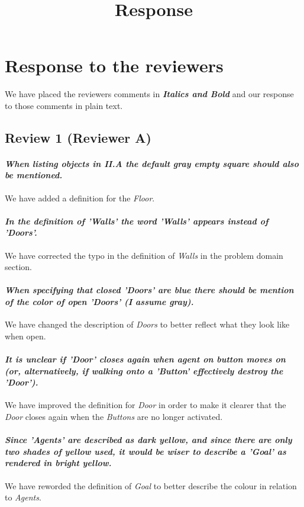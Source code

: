 \documentclass{article}
\title{Response}
\begin{document}
\maketitle
\section{Response to the reviewers}
We have placed the reviewers comments in \textit{\textbf{Italics and Bold}} and our response to those comments in plain text.

\subsection{Review 1 (Reviewer A)}
\paragraph*{\textit{When listing objects in  II.A the default gray empty square should also be mentioned.}}
We have added a definition for the \emph{Floor}.
\paragraph*{\textit{In the definition of 'Walls' the word 'Walls' appears instead of 'Doors'.}}
We have corrected the typo in the definition of \emph{Walls} in the problem domain section.
\paragraph*{\textit{When specifying that closed 'Doors' are blue there should be mention of the color of open 'Doors' (I assume gray).}}
We have changed the description of \emph{Doors} to better reflect what they look like when open.
\paragraph*{\textit{It is unclear if 'Door' closes again when agent on button moves on (or, alternatively, if walking onto a 'Button' effectively destroy the 'Door').}}
We have improved the definition for \emph{Door} in order to make it clearer that the \emph{Door} closes again when the \emph{Buttons} are no longer activated.
\paragraph*{\textit{Since 'Agents' are described as dark yellow, and since there are only two shades of yellow used, it would be wiser to describe a 'Goal' as rendered in bright yellow.}}
We have reworded the definition of \emph{Goal} to better describe the colour in relation to \emph{Agents}.
\end{document}
